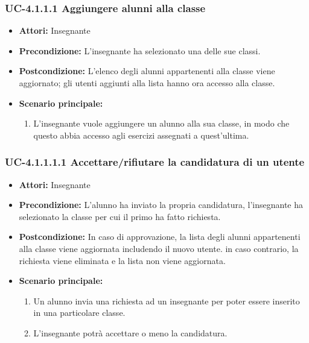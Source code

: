 \subsubsection{UC-4.1.1.1 Aggiungere alunni alla classe}
\begin{itemize}
		\item \textbf{Attori: } Insegnante
		\item \textbf{Precondizione: } L'insegnante ha selezionato una delle sue classi.
		\item \textbf{Postcondizione: } L'elenco degli alunni appartenenti alla classe viene aggiornato; gli utenti aggiunti alla lista hanno ora accesso alla classe.
		\item \textbf{Scenario principale: } 
		\begin{enumerate}
			\item L'insegnante vuole aggiungere un alunno alla sua classe, in modo che questo abbia accesso agli esercizi assegnati a quest'ultima.
		\end{enumerate}
	\end{itemize}
\subsubsection{UC-4.1.1.1.1 Accettare/rifiutare la candidatura di un utente}
\begin{itemize}
		\item \textbf{Attori: } Insegnante
		\item \textbf{Precondizione: } L'alunno ha inviato la propria candidatura, l'insegnante ha selezionato la classe per cui il primo ha fatto richiesta.
		\item \textbf{Postcondizione: } In caso di approvazione, la lista degli alunni appartenenti alla classe viene aggiornata includendo il nuovo utente. in caso contrario, la richiesta viene eliminata e la lista non viene aggiornata.
		\item \textbf{Scenario principale: } 
		\begin{enumerate}
			\item Un alunno invia una richiesta ad un insegnante per poter essere inserito in una particolare classe.
			\item L'insegnante potrà accettare o meno la candidatura.
		\end{enumerate} 
	\end{itemize}
